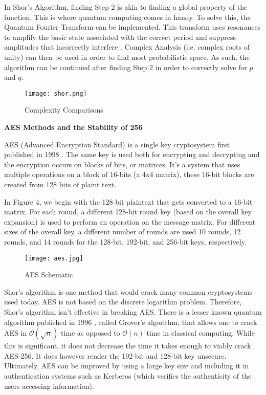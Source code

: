 \documentclass[12pt]{article}
\begin{document}
In Shor's Algorithm, finding Step 2 is akin to finding a global property of the function. This is where quantum computing comes in handy. To solve this, the Quantum Fourier Transform can be implemented. This transform uses resonances to amplify the basic state associated with the correct period and suppress amplitudes that incorrectly interfere \cite{shor}. Complex Analysis (i.e. complex roots of unity) can then be used in order to find most probabilistic space. As such, the algorithm can be continued after finding Step 2 in order to correctly solve for $p$ and $q$.

\begin{figure}[h]
\caption{Complexity Comparisons \cite{shor}}
\centering
\texttt{[image: shor.png]}
\end{figure} 

\par\vspace{1mm}

\begin{center}
	{\large \bf AES Methods and the Stability of 256}
\end{center}

AES (Advanced Encryption Standard) is a single key cryptosystem first published in 1998 \cite{aes}. The same key is used both for encrypting and decrypting and the encryption occurs on blocks of bits, or matrices. It's a system that uses multiple operations on a block of 16-bits (a 4x4 matrix), these 16-bit blocks are created from 128 bits of plaint text. 

In Figure 4, we begin with the 128-bit plaintext that gets converted to a 16-bit matrix. For each round, a different 128-bit round key (based on the overall key expansion) is used to perform an operation on the message matrix. For different sizes of the overall key, a different number of rounds are used 10 rounds, 12 rounds, and 14 rounds for the 128-bit, 192-bit, and 256-bit keys, respectively.

\begin{figure}[h]
\caption{AES Schematic \cite{tutpoint}}
\centering
\texttt{[image: aes.jpg]}
\end{figure}

Shor's algorithm is one method that would crack many common cryptosystems used today. AES  is not based on the discrete logarithm problem. Therefore, Shor's algorithm isn't effective in breaking AES. There is a lesser known quantum algorithm published in 1996 \cite{grover}, called Grover's algorithm, that allows one to crack AES in $\mathcal{O}(\sqrt{n})$ time as opposed to $\mathcal{O}(n)$ time in classical computing. While this is significant, it does not decrease the time it takes enough to viably crack AES-256\cite{resist}. It does however render the 192-bit and 128-bit key unsecure\cite{today}. Ultimately, AES can be improved by using a large key size and including it in authentication systems such as Kerberos (which verifies the authenticity of the users accessing information)\cite{kerb}.
\end{document}
